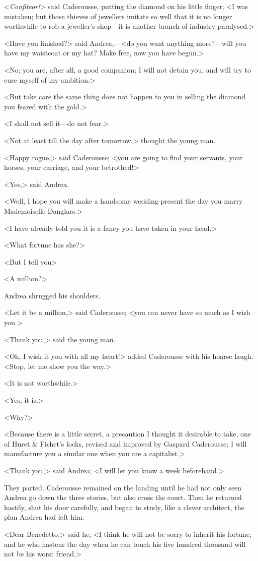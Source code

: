  <\textit{Confiteor!}> said Caderousse, putting the diamond on his little finger; <I was mistaken; but those thieves of jewellers imitate so well that it is no longer worthwhile to rob a jeweller's shop—it is another branch of industry paralysed.> 

 <Have you finished?> said Andrea,—<do you want anything more?—will you have my waistcoat or my hat? Make free, now you have begun.> 

 <No; you are, after all, a good companion; I will not detain you, and will try to cure myself of my ambition.> 

 <But take care the same thing does not happen to you in selling the diamond you feared with the gold.> 

 <I shall not sell it—do not fear.> 

 <Not at least till the day after tomorrow,> thought the young man. 

 <Happy rogue,> said Caderousse; <you are going to find your servants, your horses, your carriage, and your betrothed!> 

 <Yes,> said Andrea. 

 <Well, I hope you will make a handsome wedding-present the day you marry Mademoiselle Danglars.> 

 <I have already told you it is a fancy you have taken in your head.> 

 <What fortune has she?> 

 <But I tell you\longdash> 

 <A million?> 

 Andrea shrugged his shoulders. 

 <Let it be a million,> said Caderousse; <you can never have so much as I wish you.> 

 <Thank you,> said the young man. 

 <Oh, I wish it you with all my heart!> added Caderousse with his hoarse laugh. <Stop, let me show you the way.> 

 <It is not worthwhile.> 

 <Yes, it is.> 

 <Why?> 

 <Because there is a little secret, a precaution I thought it desirable to take, one of Huret \& Fichet's locks, revised and improved by Gaspard Caderousse; I will manufacture you a similar one when you are a capitalist.> 

 <Thank you,> said Andrea; <I will let you know a week beforehand.> 

 They parted. Caderousse remained on the landing until he had not only seen Andrea go down the three stories, but also cross the court. Then he returned hastily, shut his door carefully, and began to study, like a clever architect, the plan Andrea had left him. 

 <Dear Benedetto,> said he, <I think he will not be sorry to inherit his fortune, and he who hastens the day when he can touch his five hundred thousand will not be his worst friend.> 